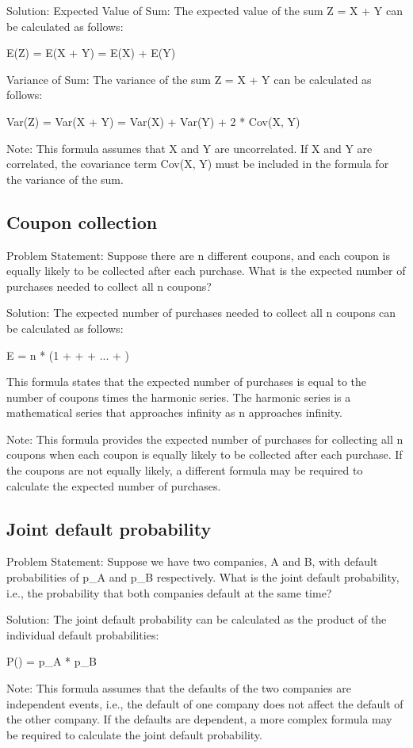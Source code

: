 \documentclass[12pt, a4paper, oneside]{article}
\begin{document}
Solution:
Expected Value of Sum:
The expected value of the sum Z = X + Y can be calculated as follows:

E(Z) = E(X + Y) = E(X) + E(Y)

Variance of Sum:
The variance of the sum Z = X + Y can be calculated as follows:

Var(Z) = Var(X + Y) = Var(X) + Var(Y) + 2 * Cov(X, Y)

Note: This formula assumes that X and Y are uncorrelated. If X and Y are correlated, the covariance term Cov(X, Y) must be included in the formula for the variance of the sum.
\subsection{ Coupon collection }
Problem Statement:
Suppose there are n different coupons, and each coupon is equally likely to be collected after each purchase. What is the expected number of purchases needed to collect all n coupons?

Solution:
The expected number of purchases needed to collect all n coupons can be calculated as follows:

E = n * (1 +  +  + ... + )

This formula states that the expected number of purchases is equal to the number of coupons times the harmonic series. The harmonic series is a mathematical series that approaches infinity as n approaches infinity.

Note: This formula provides the expected number of purchases for collecting all n coupons when each coupon is equally likely to be collected after each purchase. If the coupons are not equally likely, a different formula may be required to calculate the expected number of purchases.
\subsection{ Joint default probability }
Problem Statement:
Suppose we have two companies, A and B, with default probabilities of p_A and p_B respectively. What is the joint default probability, i.e., the probability that both companies default at the same time?

Solution:
The joint default probability can be calculated as the product of the individual default probabilities:

P() = p_A * p_B

Note: This formula assumes that the defaults of the two companies are independent events, i.e., the default of one company does not affect the default of the other company. If the defaults are dependent, a more complex formula may be required to calculate the joint default probability.
\end{document}
